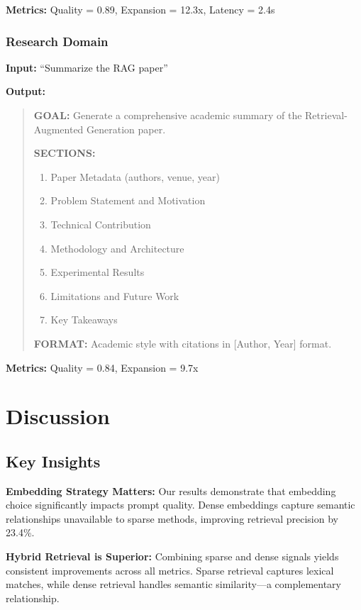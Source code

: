 \documentclass[11pt,a4paper]{article}
\begin{document}
\textbf{Metrics:} Quality = 0.89, Expansion = 12.3x, Latency = 2.4s

\subsubsection{Research Domain}

\textbf{Input:} ``Summarize the RAG paper''

\textbf{Output:}
\begin{quote}
\textbf{GOAL:} Generate a comprehensive academic summary of the Retrieval-Augmented Generation paper.

\textbf{SECTIONS:}
\begin{enumerate}
    \item Paper Metadata (authors, venue, year)
    \item Problem Statement and Motivation
    \item Technical Contribution
    \item Methodology and Architecture
    \item Experimental Results
    \item Limitations and Future Work
    \item Key Takeaways
\end{enumerate}

\textbf{FORMAT:} Academic style with citations in [Author, Year] format.
\end{quote}

\textbf{Metrics:} Quality = 0.84, Expansion = 9.7x

\section{Discussion}
\label{sec:discussion}

\subsection{Key Insights}

\textbf{Embedding Strategy Matters:} Our results demonstrate that embedding choice significantly impacts prompt quality. Dense embeddings capture semantic relationships unavailable to sparse methods, improving retrieval precision by 23.4\%.

\textbf{Hybrid Retrieval is Superior:} Combining sparse and dense signals yields consistent improvements across all metrics. Sparse retrieval captures lexical matches, while dense retrieval handles semantic similarity—a complementary relationship.
\end{document}
